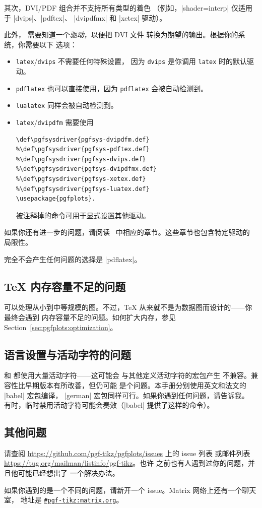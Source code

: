 其次，DVI/PDF 组合并不支持所有类型的着色
（例如，|shader=interp| 仅适用于 |dvips|、|pdftex|、
|dvipdfmx| 和 |xetex| 驱动）。

此外，\PGF{} 需要知道一个\emph{驱动}，以便把 DVI 文件
转换为期望的输出。根据你的系统，你需要以下
选项：
%
\begin{itemize}
    \item \lstinline!latex!/\lstinline!dvips! 不需要任何特殊设置，
        因为 \lstinline!dvips! 是你调用
        \lstinline!latex! 时的默认驱动。
    \item \lstinline!pdflatex! 也可以直接使用，因为
        \lstinline!pdflatex! 会被自动检测到。
    \item \lstinline!lualatex! 同样会被自动检测到。
    \item \lstinline!latex!/\lstinline!dvipdfm! 需要使用
\begin{verbatim}
\def\pgfsysdriver{pgfsys-dvipdfm.def}
%\def\pgfsysdriver{pgfsys-pdftex.def}
%\def\pgfsysdriver{pgfsys-dvips.def}
%\def\pgfsysdriver{pgfsys-dvipdfmx.def}
%\def\pgfsysdriver{pgfsys-xetex.def}
%\def\pgfsysdriver{pgfsys-luatex.def}
\usepackage{pgfplots}.
\end{verbatim}
        被注释掉的命令可用于显式设置其他驱动。
\end{itemize}
%
如果你还有进一步的问题，请阅读~\cite[Sections~7.2.1 and 7.2.2]{tikz}
中相应的章节。这些章节也包含特定驱动的
局限性。

完全不会产生任何问题的选择是 |pdflatex|。


\subsection{\TeX{} 内存容量不足的问题}

\PGFPlots{} 可以处理从小到中等规模的图。不过，\TeX{}
从来就不是为数据图而设计的——你最终会遇到
内存容量不足的问题。如何扩大内存，参见
Section~\ref{sec:pgfplots:optimization}。


\subsection{语言设置与活动字符的问题}

\PGF{} 和 \PGFPlots{} 都使用大量活动字符——这可能会
与其他定义活动字符的宏包产生
不兼容。兼容性比早期版本有所改善，但仍可能
是个问题。本手册分别使用英文和法文的 |babel| 宏包编译，
|german| 宏包同样可行。如果你遇到任何问题，请告诉我。
有时，临时禁用活动字符可能会奏效（|babel|
提供了这样的命令）。


\subsection{其他问题}

请查阅 \url{https://github.com/pgf-tikz/pgfplots/issues} 上的 issue 列表
或邮件列表 \url{https://tug.org/mailman/listinfo/pgf-tikz}。也许
之前也有人遇到过你的问题，并且他可能已经想出了
一个解决办法。

如果你遇到的是一个不同的问题，请新开一个 issue。Matrix 网络上还有一个聊天室，
地址是 \href{https://matrix.to/#/#pgf-tikz:matrix.org}{\texttt{\#pgf-tikz:matrix.org}}。

